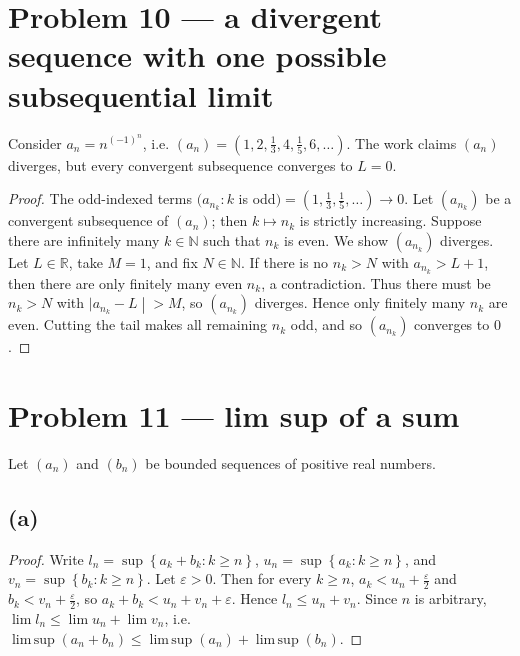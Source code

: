 \section{Problem 10 --- a divergent sequence with one possible subsequential limit}

Consider \(a_{n} = n^{{({- 1})}^{n}}\), i.e. \(\left( a_{n} \right) = \left( {1,2,\frac{1}{3},4,\frac{1}{5},6,\ldots} \right)\). The work claims \(\left( a_{n} \right)\) diverges, but every convergent subsequence converges to \(L = 0\).

\begin{proof}

The odd-indexed terms \((a_{n_{k}}:k\) is odd\() = \left( {1,\frac{1}{3},\frac{1}{5},\ldots} \right)\rightarrow 0\). Let \(\left( a_{n_{k}} \right)\) be a convergent subsequence of \(\left( a_{n} \right)\); then \(k\mapsto n_{k}\) is strictly increasing. Suppose there are infinitely many \(k \in \mathbb{N}\) such that \(n_{k}\) is even. We show \(\left( a_{n_{k}} \right)\) diverges. Let \(L \in \mathbb{R}\), take \(M = 1\), and fix \(N \in \mathbb{N}\). If there is no \(n_{k} > N\) with \(a_{n_{k}} > L + 1\), then there are only finitely many even \(n_{k}\), a contradiction. Thus there must be \(n_{k} > N\) with \(\left. |a_{n_{k}} - L \middle| > M \right.\), so \(\left( a_{n_{k}} \right)\) diverges. Hence only finitely many \(n_{k}\) are even. Cutting the tail makes all remaining \(n_{k}\) odd, and so \(\left( a_{n_{k}} \right)\) converges to \(0\).

\end{proof}

\section{Problem 11 --- lim sup of a sum}

Let \(\left( a_{n} \right)\) and \(\left( b_{n} \right)\) be bounded sequences of positive real numbers.

\subsection{(a)}

\begin{proof}

Write \(l_{n} = \sup\left\{ {a_{k} + b_{k}:k \geq n} \right\}\), \(u_{n} = \sup\left\{ {a_{k}:k \geq n} \right\}\), and \(v_{n} = \sup\left\{ {b_{k}:k \geq n} \right\}\). Let \(\varepsilon > 0\). Then for every \(k \geq n\), \(a_{k} < u_{n} + \frac{\varepsilon}{2}\) and \(b_{k} < v_{n} + \frac{\varepsilon}{2}\), so \(a_{k} + b_{k} < u_{n} + v_{n} + \varepsilon\). Hence \(l_{n} \leq u_{n} + v_{n}\). Since \(n\) is arbitrary, \(\lim l_{n} \leq \lim u_{n} + \lim v_{n}\), i.e. \(\operatorname{lim\, sup}\left( {a_{n} + b_{n}} \right) \leq \operatorname{lim\, sup}\left( a_{n} \right) + \operatorname{lim\, sup}\left( b_{n} \right)\).

\end{proof}

